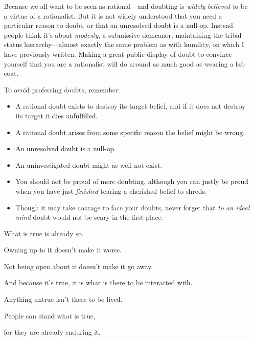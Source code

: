 {
 Because we all want to be seen as rational---and doubting is
\textit{widely believed} to be a virtue of a rationalist. But it is not
widely understood that you need a particular reason to doubt, or that
an unresolved doubt is a null-op. Instead people think
it's about \textit{modesty}, a submissive demeanor,
maintaining the tribal status hierarchy---almost exactly the same
problem as with humility, on which I have previously written. Making a
great public display of doubt to convince yourself that you are a
rationalist will do around as much good as wearing a lab coat.}

{
 To avoid professing doubts, remember:}

\begin{itemize}
\item {
 A rational doubt exists to destroy its target belief, and if it
does not destroy its target it dies unfulfilled.}

\item {
 A rational doubt arises from some specific reason the belief might
be wrong.}

\item {
 An unresolved doubt is a null-op.}

\item {
 An uninvestigated doubt might as well not exist.}

\item {
 You should not be proud of mere doubting, although you can justly
be proud when you have just \textit{finished} tearing a cherished
belief to shreds.}

\item {
 Though it may take courage to face your doubts, never forget that
 \textit{to an ideal mind} doubt would not be scary in the first place.}
\end{itemize}

\myendsectiontext


\begin{center}
{
 What is true is already so.}

{
 Owning up to it doesn't make it worse.}

{
 Not being open about it doesn't make it go away.}

{
 And because it's true, it is what is there to be
interacted with.}

{
 Anything untrue isn't there to be lived.}

{
 People can stand what is true,}

{
  for they are already enduring it.}
\end{center}

